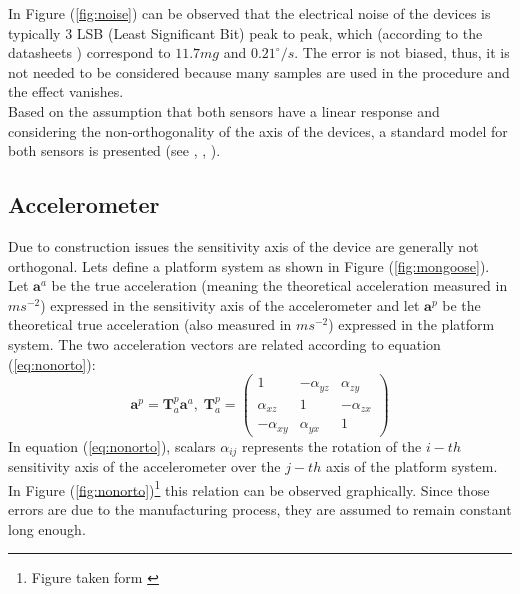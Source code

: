 \documentclass[conference]{IEEEtran}
\newcommand{\refp}[1]{(\ref{#1})}
\begin{document}
In Figure \refp{fig:noise} can be observed that the electrical noise of the devices is typically 3 LSB (Least Significant Bit) peak to peak, which (according to the datasheets \cite{bib:acc_data, bib:gyro_data}) correspond to $11.7 mg$ and $0.21 ^{\circ}/s $. The error is not biased, thus, it is not needed to be considered because many samples are used in the procedure and the effect vanishes.\\

Based on the assumption that both sensors have a linear response and considering the non-orthogonality of the axis of the devices, a standard model for both sensors is presented (see \cite{bib:calib_imu}, \cite{bib:kalman}, \cite{bib:calib_imu_dos}).

\subsection{Accelerometer}
Due to construction issues the sensitivity axis of the device are generally not orthogonal. Lets define a platform system as shown in Figure \refp{fig:mongoose}. Let $\mathbf{a}^a$ be the true acceleration (meaning the theoretical acceleration measured in $ms^{-2}$) expressed in the sensitivity axis of the accelerometer and let $\mathbf{a}^p$ be the theoretical true acceleration (also measured in $ms^{-2}$) expressed in the platform system. The two acceleration vectors are related according to equation \refp{eq:nonorto}:
\begin{equation}
\mathbf{a}^p = \mathbf{T}_a^p\mathbf{a}^a, \; \mathbf{T}_a^p = \left(\begin{array}{ccc}
1 & - \alpha_{yz} & \alpha_{zy}\\
\alpha_{xz} & 1 & - \alpha_{zx}\\
-\alpha_{xy} & \alpha_{yx} & 1
\end{array}\right)
\label{eq:nonorto}
\end{equation}
In equation \refp{eq:nonorto}, scalars $\alpha_{ij}$ represents the rotation of the $i-th$ sensitivity axis of the accelerometer over the $j-th$ axis of the platform system. In Figure \refp{fig:nonorto}\footnote{Figure taken form \cite{bib:calib_imu}} this relation can be observed graphically. Since those errors are due to the manufacturing process, they are assumed to remain constant long enough.
\end{document}
